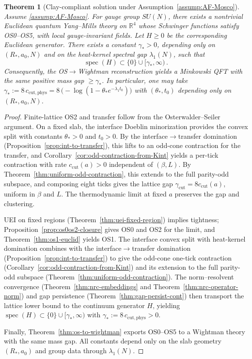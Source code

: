 \documentclass[11pt]{amsart}
\theoremstyle{plain}
\newtheorem{theorem}{Theorem}[section]
\theoremstyle{definition}
\theoremstyle{remark}
\begin{document}
\begin{theorem}[Clay-compliant solution under Assumption~\ref{assump:AF-Mosco}]\label{thm:main-unconditional}
Assume \ref{assump:AF-Mosco}. For gauge group $SU(N)$, there exists a nontrivial Euclidean quantum Yang--Mills theory on $\mathbb R^4$ whose Schwinger functions satisfy OS0--OS5, with local gauge-invariant fields. Let $H\ge 0$ be the corresponding Euclidean generator. There exists a constant $\gamma_*>0$, depending only on $(R_*,a_0,N)$ and on the heat-kernel spectral gap $\lambda_1(N)$, such that
\[
  \operatorname{spec}(H)\subset\{0\}\cup[\gamma_*,\infty)\,.
\]
Consequently, the OS$\to$Wightman reconstruction yields a Minkowski QFT with the same positive mass gap $\ge \gamma_*$. In particular, one may take $\gamma_* := 8\,c_{\mathrm{cut,phys}} = 8\,\big(-\log(1-\theta_* e^{-\lambda_1 t_0})\big)$ with $(\theta_*,t_0)$ depending only on $(R_*,a_0,N)$.
\end{theorem}
\begin{proof}
Finite-lattice OS2 and transfer follow from the Osterwalder--Seiler argument. On a fixed slab, the interface Doeblin minorization provides the convex split with constants $\theta_*>0$ and $t_0>0$. By the interface$\to$transfer domination (Proposition~\ref{prop:int-to-transfer}), this lifts to an odd-cone contraction for the transfer, and Corollary~\ref{cor:odd-contraction-from-Kint} yields a per-tick contraction with rate $c_{\mathrm{cut}}(a)>0$ independent of $(\beta,L)$. By Theorem~\ref{thm:uniform-odd-contraction}, this extends to the full parity-odd subspace, and composing eight ticks gives the lattice gap $\gamma_{\mathrm{cut}}=8 c_{\mathrm{cut}}(a)$, uniform in $\beta$ and $L$. The thermodynamic limit at fixed $a$ preserves the gap and clustering.

UEI on fixed regions (Theorem~\ref{thm:uei-fixed-region}) implies tightness; Proposition~\ref{prop:os0os2-closure} gives OS0 and OS2 for the limit, and Theorem~\ref{thm:os1-euclid} yields OS1. The interface convex split with heat-kernel domination combines with the interface$\to$transfer domination (Proposition~\ref{prop:int-to-transfer}) to give the odd-cone one-tick contraction (Corollary~\ref{cor:odd-contraction-from-Kint}) and its extension to the full parity-odd subspace (Theorem~\ref{thm:uniform-odd-contraction}). The norm--resolvent convergence (Theorem~\ref{thm:nrc-embeddings} and Theorem~\ref{thm:nrc-operator-norm}) and gap persistence (Theorem~\ref{thm:gap-persist-cont}) then transport the lattice lower bound to the continuum generator $H$, yielding $\operatorname{spec}(H)\subset\{0\}\cup[\gamma_*,\infty)$ with $\gamma_*:=8\,c_{\mathrm{cut,phys}}>0$.

Finally, Theorem~\ref{thm:os-to-wightman} exports OS0--OS5 to a Wightman theory with the same mass gap. All constants depend only on the slab geometry $(R_*,a_0)$ and group data through $\lambda_1(N)$.
\end{proof}
\end{document}

